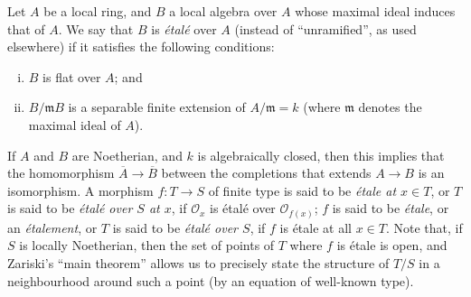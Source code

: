 \documentclass{article}
\theoremstyle{plain}
\theoremstyle{definition}
\newcommand{\sh}[1]{{\mathscr{#1}}}
\newcommand{\fk}[1]{{\mathfrak{#1}}}
\begin{document}
Let $A$ be a local ring, and $B$ a local algebra over $A$ whose maximal ideal induces that of $A$.
We say that $B$ is \emph{\'{e}tal\'{e}} over $A$ (instead of ``unramified'', as used elsewhere) if it satisfies the following conditions:
\begin{enumerate}[(i)]
  \item $B$ is flat over $A$; and
  \item $B/\fk{m}B$ is a separable finite extension of $A/\fk{m}=k$ (where $\fk{m}$ denotes the maximal ideal of $A$).
\end{enumerate}
If $A$ and $B$ are Noetherian, and $k$ is algebraically closed, then this implies that the homomorphism $\overline{A}\to\overline{B}$ between the completions that extends $A\to B$ is an isomorphism.
A morphism $f\colon T\to S$ of finite type is said to be \emph{\'{e}tale at $x\in T$}, or $T$ is said to be \emph{\'{e}tal\'{e} over $S$ at $x$}, if $\sh{O}_x$ is \'{e}tal\'{e} over $\sh{O}_{f(x)}$;
$f$ is said to be \emph{\'{e}tale}, or an \emph{\'{e}talement}, or $T$ is said to be \emph{\'{e}tal\'{e} over $S$}, if $f$ is \'{e}tale at all $x\in T$.
Note that, if $S$ is locally Noetherian, then the set of points of $T$ where $f$ is \'{e}tale is open, and Zariski's ``main theorem'' allows us to precisely state the structure of $T/S$ in a neighbourhood around such a point (by an equation of well-known type).
\end{document}
